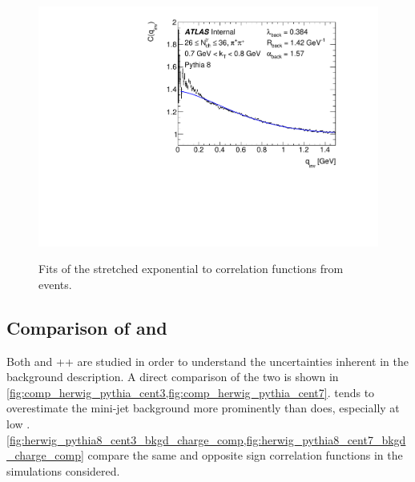 \begin{figure}[t]
\begin{minipage}[t]{1.0\textwidth}
\includegraphics[width=.49\linewidth]{Cqinv_pythia_cent7_e1_kt6.pdf}\\
\end{minipage}
\caption{Fits of the stretched exponential to correlation functions from \PYEight events.}
\label{fig:pythia_bckg_fit_cent7}
\end{figure}


\subsection{Comparison of \Herwig and \PYEight}
\label{subsec:herwig_vs_pythia}

Both \PYEight and \Herwig++ are studied in order to understand the uncertainties inherent in the background description.
A direct comparison of the two is shown in \cref{fig:comp_herwig_pythia_cent3,fig:comp_herwig_pythia_cent7}.
\Herwig tends to overestimate the mini-jet background more prominently than \PYEight does, especially at low \kt.
\cref{fig:herwig_pythia8_cent3_bkgd_charge_comp,fig:herwig_pythia8_cent7_bkgd_charge_comp} compare the same and opposite sign correlation functions in the simulations considered.

